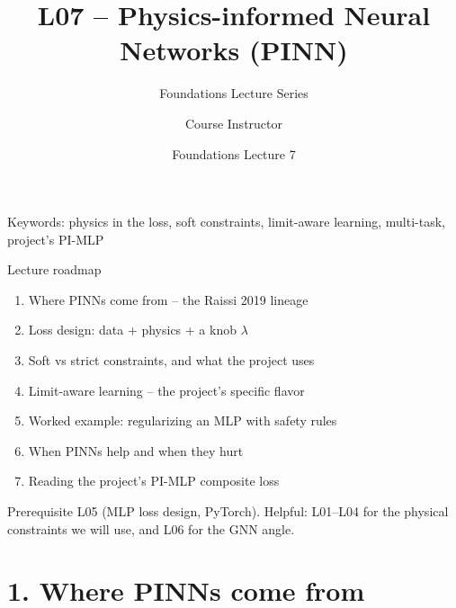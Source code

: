 \documentclass[aspectratio=169,10pt]{beamer}
\title[L07: PINN]{L07 -- Physics-informed Neural Networks (PINN)}
\subtitle{Foundations Lecture Series}
\author{Course Instructor}
\institute{Microgrid 3-phase Security AI Project}
\date{Foundations Lecture 7}
\begin{document}
\begin{frame}
  \titlepage
  \vspace{-0.8em}
  \begin{center}
    \small Keywords: physics in the loss, soft constraints, limit-aware learning, multi-task, project's PI-MLP
  \end{center}
\end{frame}

\begin{frame}{Lecture roadmap}
\begin{enumerate}
  \item Where PINNs come from -- the Raissi 2019 lineage
  \item Loss design: data + physics + a knob $\lambda$
  \item Soft vs strict constraints, and what the project uses
  \item Limit-aware learning -- the project's specific flavor
  \item Worked example: regularizing an MLP with safety rules
  \item When PINNs help and when they hurt
  \item Reading the project's PI-MLP composite loss
\end{enumerate}
\vspace{0.6em}
\begin{block}{Prerequisite}
L05 (MLP loss design, PyTorch). Helpful: L01--L04 for the physical constraints we will use, and L06 for the GNN angle.
\end{block}
\end{frame}

\section*{1. Where PINNs come from}
\end{document}
